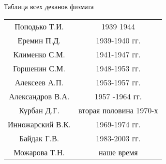 \documentclass[pdf,hyperref={unicode}, aspectratio=43, serif,11pt]{beamer}
\begin{document}
\begin{frame}{Таблица всех деканов физмата}
    \begin{tabular}{|c|S|}
        \hline
        Поподько Т.И. & 1939 1944 \\
        Еремин П.Д. & 1939-1940 гг.\\
        Клименко С.М. & 1941-1947 гг. \\
        Горшенин С.М. & 1948-1953 гг. \\
        Алексеев А.П. & 1953-1957 гг. \\
        Александров В.А. & 1957 -1964 гг. \\ 
        Курбан Д.Г. & вторая половина 1970-х \\
        Инножарский В.К. & 1969-1974 гг. \\
        Байдак Г.В. & 1983-2003 гг. \\
        Можарова Т.Н. & наше время \\
        \hline
    \end{tabular}
\end{frame}
\end{document}

